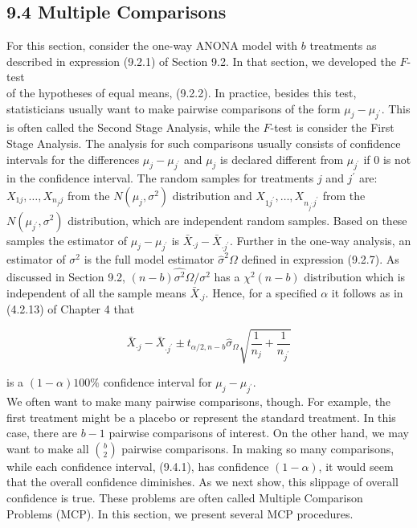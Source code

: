 \subsection*{9.4 Multiple Comparisons}
For this section, consider the one-way ANONA model with $b$ treatments as described in expression (9.2.1) of Section 9.2. In that section, we developed the $F$-test\\
of the hypotheses of equal means, (9.2.2). In practice, besides this test, statisticians usually want to make pairwise comparisons of the form $\mu_{j}-\mu_{j^{\prime}}$. This is often called the Second Stage Analysis, while the $F$-test is consider the First Stage Analysis. The analysis for such comparisons usually consists of confidence intervals for the differences $\mu_{j}-\mu_{j^{\prime}}$ and $\mu_{j}$ is declared different from $\mu_{j^{\prime}}$ if 0 is not in the confidence interval. The random samples for treatments $j$ and $j^{\prime}$ are: $X_{1 j}, \ldots, X_{n_{j} j}$ from the $N\left(\mu_{j}, \sigma^{2}\right)$ distribution and $X_{1 j^{\prime}}, \ldots, X_{n_{j^{\prime}} j^{\prime}}$ from the $N\left(\mu_{j^{\prime}}, \sigma^{2}\right)$ distribution, which are independent random samples. Based on these samples the estimator of $\mu_{j}-\mu_{j^{\prime}}$ is $\bar{X}_{\cdot j}-\bar{X}_{\cdot j^{\prime}}$. Further in the one-way analysis, an estimator of $\sigma^{2}$ is the full model estimator $\hat{\sigma}^{2} \Omega$ defined in expression (9.2.7). As discussed in Section 9.2, $(n-b) \hat{\sigma^{2}} \Omega / \sigma^{2}$ has a $\chi^{2}(n-b)$ distribution which is independent of all the sample means $\bar{X}_{. j}$. Hence, for a specified $\alpha$ it follows as in (4.2.13) of Chapter 4 that


\begin{equation*}
\bar{X}_{\cdot j}-\bar{X}_{\cdot j^{\prime}} \pm t_{\alpha / 2, n-b} \hat{\sigma}_{\Omega} \sqrt{\frac{1}{n_{j}}+\frac{1}{n_{j^{\prime}}}} \tag{9.4.1}
\end{equation*}


is a $(1-\alpha) 100 \%$ confidence interval for $\mu_{j}-\mu_{j^{\prime}}$.\\
We often want to make many pairwise comparisons, though. For example, the first treatment might be a placebo or represent the standard treatment. In this case, there are $b-1$ pairwise comparisons of interest. On the other hand, we may want to make all $\binom{b}{2}$ pairwise comparisons. In making so many comparisons, while each confidence interval, (9.4.1), has confidence $(1-\alpha)$, it would seem that the overall confidence diminishes. As we next show, this slippage of overall confidence is true. These problems are often called Multiple Comparison Problems (MCP). In this section, we present several MCP procedures.

